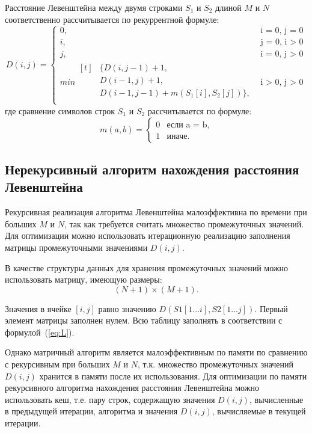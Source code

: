 Расстояние Левенштейна между двумя строками $S_{1}$ и $S_{2}$ длиной $M$ и $N$ соответственно рассчитывается по рекуррентной формуле:
\begin{equation}
	\label{eq:L}
	D(i, j) =
	\begin{cases}
		0, &\text{i = 0, j = 0}\\
		i, &\text{j = 0, i > 0}\\
		j, &\text{i = 0, j > 0}\\
		min\!\begin{aligned}[t]&\{ D(i, j - 1) + 1,\\ &D(i - 1, j) + 1,\\ &D(i - 1, j - 1) +  m(S_{1}[i], S_{2}[j])\},\\
		\end{aligned} &\text{i > 0, j > 0}
	\end{cases}
\end{equation}
где сравнение символов строк $S_1$ и $S_2$ рассчитывается по формуле:
\begin{equation}
	\label{eq:m}
	m(a, b) = \begin{cases}
		0 &\text{если a = b,}\\
		1 &\text{иначе.}
	\end{cases}
\end{equation}

\subsection{Нерекурсивный алгоритм нахождения расстояния Левенштейна}

Рекурсивная реализация алгоритма Левенштейна малоэффективна по времени при больших $M$ и $N$, так как требуется считать множество промежуточных значений.
Для оптимизации можно использовать итерационную реализацию заполнения матрицы промежуточными значениями $D(i,j)$.

В качестве структуры данных для хранения промежуточных значений можно использовать матрицу, имеющую размеры:
\begin{equation}
	\label{eq:lev-m-size}
	(N + 1) \times (M + 1).
\end{equation}

Значения в ячейке $[i, j]$ равно значению $D(S1[1...i], S2[1...j])$. Первый элемент матрицы заполнен нулем. Всю таблицу заполнять в соответствии с формулой~(\ref{eq:L}).

Однако матричный алгоритм является малоэффективным по памяти по сравнению с рекурсивным при больших $M$ и $N$, т.к. множество промежуточных значений $D(i,j)$ хранится в памяти после их использования. Для оптимизации по памяти рекурсивного алгоритма нахождения расстояния Левенштейна можно использовать кеш, т.е. пару строк, содержащую значения $D(i,j)$, вычисленные в предыдущей итерации, алгоритма и значения $D(i,j)$, вычисляемые в текущей итерации.

